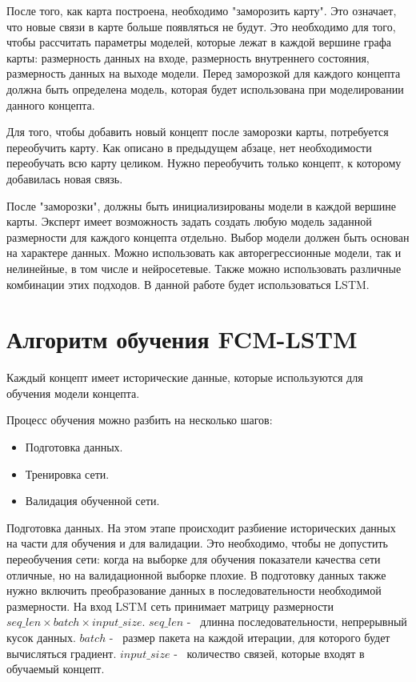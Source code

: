 После того, как карта построена, необходимо "заморозить карту".
Это означает, что новые связи в карте больше появляться не будут.
Это необходимо для того, чтобы рассчитать параметры моделей, которые
лежат в каждой вершине графа карты: размерность данных на входе,
размерность внутреннего состояния, размерность данных на выходе модели.
Перед заморозкой для каждого концепта должна быть определена модель,
которая будет использована при моделировании данного концепта.

Для того, чтобы добавить новый концепт после заморозки карты,
потребуется переобучить карту. Как описано в предыдущем абзаце,
нет необходимости переобучать всю карту целиком. Нужно переобучить только
концепт, к которому добавилась новая связь.

После "заморозки", должны быть инициализированы модели в каждой вершине
карты. Эксперт имеет возможность задать создать любую модель заданной размерности
для каждого концепта отдельно. Выбор модели должен быть основан
на характере данных. Можно использовать как авторегрессионные модели,
так и нелинейные, в том числе и нейросетевые. Также можно использовать различные комбинации
этих подходов. В данной работе будет использоваться LSTM.

\section{Алгоритм обучения FCM-LSTM}

Каждый концепт имеет исторические данные, которые используются
для обучения модели концепта.

Процесс обучения можно разбить на несколько шагов:

\begin{itemize}
	\item Подготовка данных.
	\item Тренировка сети.
	\item Валидация обученной сети.
\end{itemize}

Подготовка данных. На этом этапе происходит разбиение
исторических данных на части для обучения и для валидации.
Это необходимо, чтобы не допустить переобучения сети:
когда на выборке для обучения показатели качества сети
отличные, но на валидационной выборке плохие.
В подготовку данных также нужно включить преобразование данных
в последовательности необходимой размерности. На вход
LSTM сеть принимает матрицу размерности $ seq\_len \times batch \times input\_size $.
$ seq\_len $ -~ длинна последовательности, непрерывный кусок данных.
$ batch $ -~ размер пакета на каждой итерации, для которого будет вычисляться градиент.
$ input\_size $ -~ количество связей, которые входят в обучаемый концепт.

